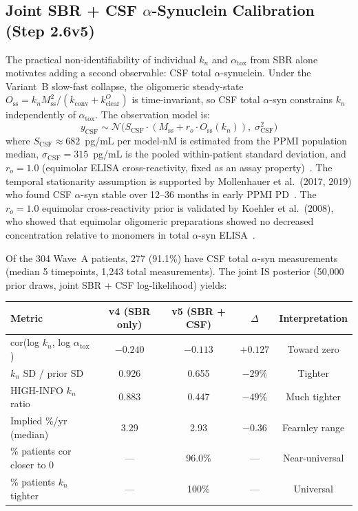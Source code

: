 \subsection{Joint SBR + CSF $\alpha$-Synuclein Calibration (Step 2.6v5)}
\label{sec:mech-csf-joint}

The practical non-identifiability of individual $k_n$ and $\alpha_\text{tox}$ from SBR alone motivates adding a second observable: CSF total $\alpha$-synuclein. Under the Variant~B slow-fast collapse, the oligomeric steady-state $O_\text{ss} = k_n M_\text{ss}^2 / (k_\text{conv} + k_\text{clear}^O)$ is time-invariant, so CSF total $\alpha$-syn constrains $k_n$ independently of $\alpha_\text{tox}$. The observation model is:
\begin{equation}
y_\text{CSF} \sim \mathcal{N}\bigl(S_\text{CSF} \cdot (M_\text{ss} + r_o \cdot O_\text{ss}(k_n)),\; \sigma_\text{CSF}^2\bigr)
\label{eq:csf-obs}
\end{equation}
where $S_\text{CSF} \approx 682$~pg/mL per model-nM is estimated from the PPMI population median, $\sigma_\text{CSF} = 315$~pg/mL is the pooled within-patient standard deviation, and $r_o = 1.0$ (equimolar ELISA cross-reactivity, fixed as an assay property)~\cite{mollenhauer2011,majbour2016}. The temporal stationarity assumption is supported by Mollenhauer et al.\ (2017, 2019) who found CSF $\alpha$-syn stable over 12--36 months in early PPMI PD~\cite{mollenhauer2017csf}. The $r_o = 1.0$ equimolar cross-reactivity prior is validated by Koehler et al.\ (2008), who showed that equimolar oligomeric preparations showed no decreased concentration relative to monomers in total $\alpha$-syn ELISA~\cite{petricca2022}.

Of the 304 Wave~A patients, 277 (91.1\%) have CSF total $\alpha$-syn measurements (median 5 timepoints, 1,243 total measurements). The joint IS posterior (50,000 prior draws, joint SBR + CSF log-likelihood) yields:

\begin{center}
\small
\begin{tabular}{lcccc}
\toprule
\textbf{Metric} & \textbf{v4 (SBR only)} & \textbf{v5 (SBR + CSF)} & \textbf{$\Delta$} & \textbf{Interpretation} \\
\midrule
cor(log $k_n$, log $\alpha_\text{tox}$) & $-0.240$ & $-0.113$ & $+0.127$ & Toward zero \\
$k_n$ SD / prior SD & 0.926 & 0.655 & $-29\%$ & Tighter \\
HIGH-INFO $k_n$ ratio & 0.883 & 0.447 & $-49\%$ & Much tighter \\
Implied \%/yr (median) & 3.29 & 2.93 & $-0.36$ & Fearnley range \\
\% patients cor closer to 0 & --- & 96.0\% & --- & Near-universal \\
\% patients $k_n$ tighter & --- & 100\% & --- & Universal \\
\bottomrule
\end{tabular}
\end{center}

